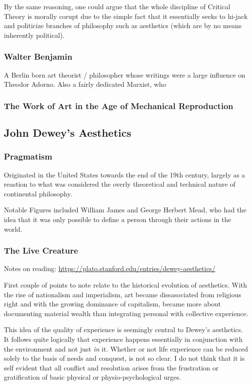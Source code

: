 \documentclass[11pt]{article}
\begin{document}
By the same reasoning, one could argue that the whole discipline of
Critical Theory is morally corupt due to the simple fact that it
essentially seeks to hi-jack and politicize branches of philosophy
such as aesthetics (which are by no means inherently political).

\subsubsection{Walter Benjamin}
\label{sec:org124fac6}
A Berlin born art theorist / philosopher whose writings were a large
influence on Theodor Adorno. Also a fairly dedicated Marxist, who 

\subsubsection{The Work of Art in the Age of Mechanical Reproduction}
\label{sec:org5f99ce2}

\subsection{John Dewey's Aesthetics}
\label{sec:orgc391487}
\subsubsection{Pragmatism}
\label{sec:org3fd07cd}
Originated in the United States towards the end of the 19th century,
largely as a reastion to what was considered the overly theoretical 
and technical nature of continental philosophy.

Notable Figures included William James and George Herbert Mead, who
had the idea that it was only possible to define a person through
their actions in the world.

\subsubsection{The Live Creature}
\label{sec:orgde6aed6}

Notes on reading: \url{https://plato.stanford.edu/entries/dewey-aesthetics/}

First couple of points to note relate to the historical evolution of
aesthetics. With the rise of nationalism and imperialism, art became
dissasociated from religious right and with the growing dominance of
capitalism, became more about documenting material wealth than
integrating personal with collective experience. 

This idea of the quality of experience is seemingly central to Dewey's
aesthetics. It follows quite logically that experience happens
essentially in conjunction with the environment and not just \emph{in}
it. Whether or not life experience can be reduced solely to the basis
of needs and conquest, is not so clear. I do not think that it is self
evident that all conflict and resolution arises from the frustration
or gratification of basic physical or physio-psychological urges. 
\end{document}
